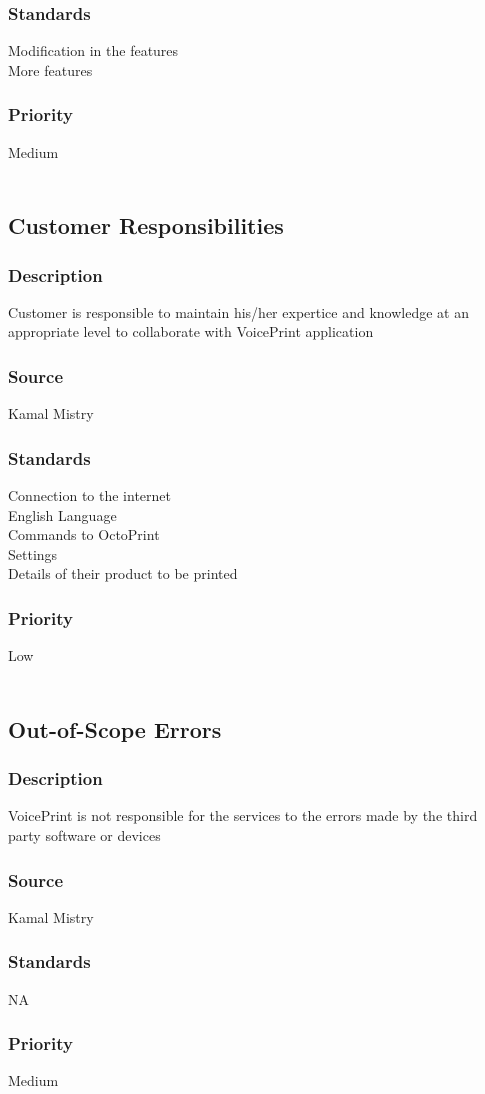 \subsubsection{Standards}
Modification in the features \\
More features 
\subsubsection{Priority}
Medium
\\
\\
\subsection{Customer Responsibilities}
\subsubsection{Description}
Customer is responsible to maintain his/her expertice and knowledge at an appropriate level to collaborate with VoicePrint application \cite{viavisolution}
\subsubsection{Source}
Kamal Mistry
\subsubsection{Standards}
Connection to the internet\\
English Language\\
Commands to OctoPrint\\
Settings\\  
Details of their product to be printed 
\subsubsection{Priority}
Low
\\
\\
\subsection{Out-of-Scope Errors}
\subsubsection{Description}
VoicePrint is not responsible for the services to the errors made by the third party software or devices
\subsubsection{Source}
Kamal Mistry
\subsubsection{Standards}
NA
\subsubsection{Priority}
Medium

